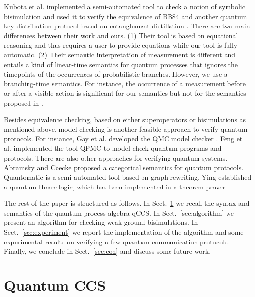 \documentclass[runningheads]{llncs}
\begin{document}
Kubota et al. \cite{KKKKS16} implemented a semi-automated tool to check a notion of symbolic bisimulation and used it to verify the equivalence of BB84 and another quantum key distribution protocol based on entanglement distillation \cite{SP00}. There are two main differences between their work and ours. (1) Their tool is based on equational reasoning and thus requires a user to provide equations while our tool is fully automatic. (2) Their semantic interpretation of measurement is different and entails a kind of linear-time semantics for quantum processes that ignores the timepoints of the occurrences of probabilistic branches. However, we use a branching-time semantics. For instance, the occurrence of a measurement before or after a visible action is significant for our semantics but not for the semantics proposed in \cite{KKKKS16}.

Besides equivalence checking, based on either superoperators or bisimulations as mentioned above, model checking is another feasible approach to verify quantum protocols. For instance, Gay et al. developed the QMC model checker \cite{GNP08}.
Feng et al. implemented the tool QPMC \cite{FHTZ15} to model check quantum programs and protocols. There are also other approaches for verifying quantum systems. Abramsky and Coecke \cite{AC04} proposed a categorical semantics for quantum protocols. Quantomatic \cite{Kis11} is a semi-automated tool based on graph rewriting. Ying \cite{Yin16} established a quantum Hoare logic, which has been implemented in a theorem prover \cite{LLWYZ16}.

The rest of the paper is structured as follows. %
In Sect.~\ref{sec:qccs} we recall the syntax and semantics of the quantum process algebra qCCS. In Sect.~\ref{sec:algorithm} we present an algorithm for checking weak ground bisimulations. In Sect.~\ref{sec:experiment} we report the implementation of the algorithm and some experimental results on verifying a few quantum communication protocols. Finally, we conclude in Sect.~\ref{sec:con} and discuss some future work.


\section{Quantum CCS}\label{sec:qccs}
\end{document}

